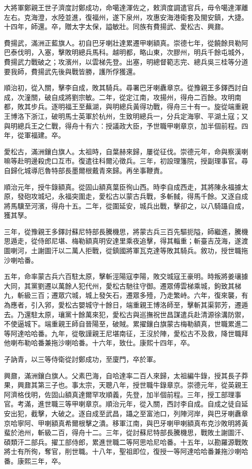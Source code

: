 \begin{pinyinscope}
大將軍鄭親王世子濟度討鄭成功，命噶達渾佐之，敕濟度調遣官兵，毋令噶達渾離左右。克海澄，水陸並進，復福州，遂下泉州，攻惠安海港衛套及閩安鎮，大捷。十四年，師還。卒，贈太字太保，謚敏壯。同族有費揚武、愛松古、興鼐。

費揚武，滿洲正藍旗人。初自巴牙喇壯達累遷甲喇額真。崇德七年，從饒餘貝勒阿巴泰伐明，入塞，擊敗明總兵馬科。越明都，略山東，次膠州，明兵千餘屯城外，費揚武力戰破之；攻濱州，以雲梯先登。出塞，明總督範志完、總兵吳三桂等分道要我師，費揚武先後與戰皆勝，護所俘獲還。

順治初，從入關，擊李自成，敗其騎兵。尋署巴牙喇纛章京。從豫親王多鐸西討自成，次潼關，破自成將劉宗敏。二年，從定江南，攻揚州，得舟二百餘。攻明南都，敗其步兵。逐明福王至蕪湖，與明總兵黃得功戰，得舟三十有一。旋從端重親王博洛下浙江，破明馬士英軍於杭州，生致明總兵一，分兵定海寧、平湖土寇；又與明總兵王之仁戰，得舟十有六：授議政大臣，予世職甲喇章京，加半個前程。四年，從軍福建。卒。

愛松古，滿洲鑲白旗人。太祖時，自葉赫來歸，屢從征伐。崇德元年，命與察漢喇嘛等赴明邊殺虎口互市。復遣往科爾沁徵兵。三年，初設理籓院，授副理事官。尋自歸化城導厄魯特部長墨爾根戴青來歸。再坐事鞭責。

順治元年，授牛錄額真。從固山額真葉臣徇山西。時李自成西走，其將陳永福據太原，發砲攻城圮，永福突圍走，愛松古以蒙古兵戰，多斬馘，得馬千餘。又逐自成將馬驥至河濱，得舟十五。二年，從圍延安，城兵出戰，擊卻之，以八騎躡自成，獲其孥。

三年，從豫親王多鐸討蘇尼特部長騰機思，將蒙古兵三百先驅扼隘，師繼進，騰機思遁走，從侍郎尼堪、梅勒額真明安達里乘夜追擊，得其輜重；斬臺吉茂海，遂渡圖喇河，土謝圖汗以二萬人拒戰，從鎮國將軍瓦克達等敗其騎兵。敘功，授世職拖沙喇哈番。

五年，命率蒙古兵六百駐太原，擊斬涇陽寇李陽，敗交城寇王豪明。時叛將姜瓖據大同，其黨劉遷以萬餘人犯代州，愛松古馳往守御。遷眾傅雲梯乘城，鉤致其梯九，斬級三百；遷眾穴城，城上發矢石，遷眾多殪，乃走繁峙。六年，復來襲，有為應者，引入郛，愛松古嬰城守十餘日，端重親王博洛師至，擊斬其渠郭芳，遷遁去。乃還駐太原，瓖黨十餘萬來犯，愛松古與巡撫祝世昌謀遣兵赴清源徐溝防禦，不使逼城下。端重親王師自晉陽至，破賊。累擢鑲白旗蒙古梅勒額真，世職累進二等阿達哈哈番。九年，從敬謹親王尼堪南征，王沒於陣，愛松古不及救，降世職拜他喇布勒哈番兼拖沙喇哈番。十六年，致仕。康熙十四年，卒。

子訥青，以三等侍衛從討鄭成功，至廈門，卒於軍。

興鼐，滿洲鑲白旗人。父素巴海，自哈達率二百人來歸，太祖編牛錄，授其長子莽果，興鼐其第三子也。事太宗，天聰八年，授世職牛錄章京。崇德元年，從英親王阿濟格伐明，佐固山額真達爾罕攻順義，先登，加半個前程。三年，授工部理事官。考滿，進世職三等甲喇章京。順治元年，從入關，西討李自成。自成之徒自延安出犯，截擊，大破之。逐自成至武昌，躡之至富池口，列陣河岸，與巴牙喇纛章京哈寧阿、甲喇額真希爾根擊之潰。移軍江南，與巴牙喇甲喇額真布克沙敗明將黃蜚於池州，斬級二百，得舟十二。三年，從討蘇尼特部長騰機思，戰敗土謝圖汗、碩類汗二部兵。擢工部侍郎，累進世職二等阿思哈尼哈番。十五年，以勘羅源戰敗將士有所徇，奪官，削世職。十八年，聖祖即位，復授一等阿達哈哈番兼拖沙喇哈番。康熙三年，卒。


\end{pinyinscope}
